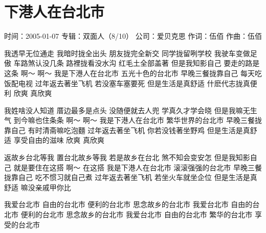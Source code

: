 \documentclass[UTF8,a4paper,oneside,twocolumn,12pt]{ctexbook}
\newcommand{\infopair}[2]{\textbullet #1：#2}
\newcommand{\zc}[1][伍佰]{\infopair{作词}{#1}}
\newcommand{\zq}[1][伍佰]{\infopair{作曲}{#1}}
\newcommand{\zj}[1]{\infopair{专辑}{#1}}
\newcommand{\sj}[1]{\infopair{时间}{#1}}
\newcommand{\gs}[1]{\infopair{公司}{#1}}
\newenvironment{info}{\begin{flushleft}\kaishu
	}
	{\end{flushleft}\normalsize\yahei\par}
\newenvironment{lyric}{
	}
{}
\begin{document}
\section{下港人在台北市}
\begin{info}
	\sj{2005-01-07}
	\zj{双面人（8/10）}
	\gs{爱贝克思}
	\zc
	\zq
\end{info}
\begin{lyric}
	我透早无位通走 我暗时拢全出头
	朋友拢完全新交 同学拢留咧学校
	我驶车变做足傲 车路煞认没几条
	路裡拢看没水沟 红毛土全部盖著
	但是我知影自己 要走的路是这条 啊～ 啊～
	我是下港人在台北市 五光十色的台北市
	早晚三餐拢靠自己 每天吃饭配电视
	过年返去著坐飞机 若没塞车塞要死
	但是生活是真舒适 什麽代志拢真便利
	欣爽 真欣爽

	我姓啥没人知道 厝边最多是点头
	没随便就去人兜 学真久才学会晓
	但是我嘛无生气 到今嘛也住条条 啊～ 啊～
	我是下港人在台北市 繁华世界的台北市
	早晚三餐拢靠自己 有时清斋嘛吃泡麵
	过年返去著坐飞机 你若没钱著坐野鸡
	但是生活是真舒适 享受自由的滋味
	欣爽 真欣爽

	返故乡台北等我 置台北故乡等我
	若是故乡在台北 煞不知会变安怎
	但是我知影自己 就是要住在这搭 啊～ 在这搭
	我是下港人在台北市 滚滚强强的台北市
	早晚三餐拢靠自己 吃不惯习就自己煮
	过年返去著坐飞机 若坐火车就坐企位
	但是生活是真舒适 嘛没亲戚甲你比

	我爱台北市 自由的台北市
	便利的台北市 思念故乡的台北市
	我爱台北市 自由的台北市
	便利的台北市 思念故乡的台北市
	我爱台北市 自由的台北市
	繁华的台北市 享受的台北市
\end{lyric}
\end{document}
